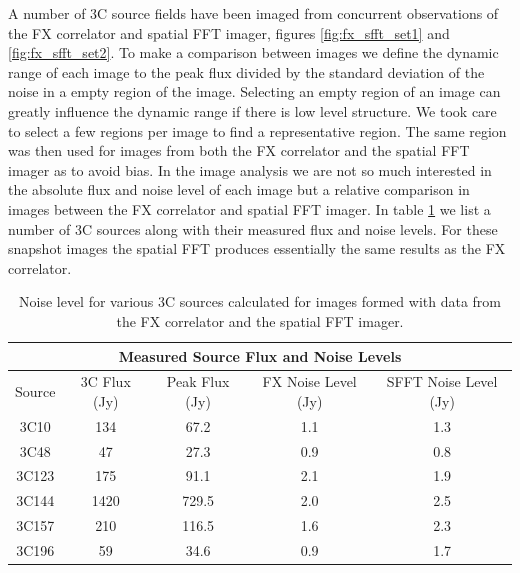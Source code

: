 \documentclass[useAMS,macros,usenatbib]{mn2e}
\begin{document}
A number of 3C source fields have been imaged from concurrent observations of the FX correlator and spatial FFT imager, figures \ref{fig:fx_sfft_set1} and \ref{fig:fx_sfft_set2}.
To make a comparison between images we define the dynamic range of each image to the peak flux divided by the standard deviation of the noise in a empty region of the image.
Selecting an empty region of an image can greatly influence the dynamic range if there is low level structure. 
We took care to select a few regions per image to find a representative region.
The same region was then used for images from both the FX correlator and the spatial FFT imager as to avoid bias.
In the image analysis we are not so much interested in the absolute flux and noise level of each image but a relative comparison in images between the FX correlator and spatial FFT imager.
In table \ref{tbl:src_flux} we list a number of 3C sources along with their measured flux and noise levels.
For these snapshot images the spatial FFT produces essentially the same results as the FX correlator.

\begin{table}
\begin{center}
\begin{tabular}{|c||c|c|c|c|}
\multicolumn{5}{|c|}{Measured Source Flux and Noise Levels}\\
\hline
Source & 3C Flux (Jy) & Peak Flux (Jy) & FX Noise Level (Jy) & SFFT Noise Level (Jy) \\ \hline
    3C10  &   134 &  67.2 & 1.1 & 1.3 \\
    3C48  &    47 &  27.3 & 0.9 & 0.8 \\
    3C123 &   175 &  91.1 & 2.1 & 1.9 \\
    3C144 &  1420 & 729.5 & 2.0 & 2.5 \\
    3C157 &   210 & 116.5 & 1.6 & 2.3 \\
    3C196 &    59 &  34.6 & 0.9 & 1.7 \\ \hline
\end{tabular}
\caption{Noise level for various 3C sources calculated for images formed with data from the FX correlator and the spatial FFT imager.}
\label{tbl:src_flux}
\end{center}
\end{table}
\end{document}
